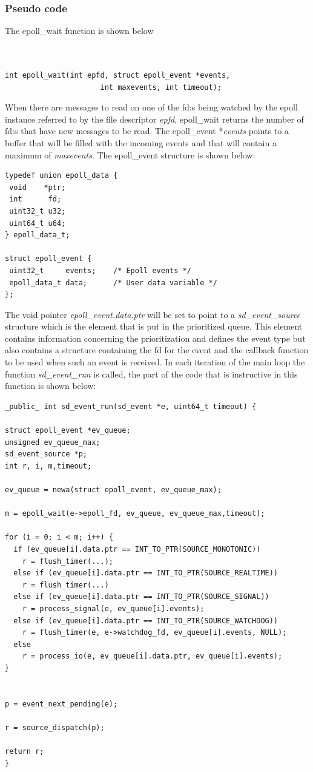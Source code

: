 \documentclass[nobiblatex]{LTHthesis}
\begin{document}
\subsubsection{Pseudo code}
The epoll\_wait function is shown below
\begin{verbatim}


int epoll_wait(int epfd, struct epoll_event *events,
                      int maxevents, int timeout);	 
\end{verbatim}
When there are messages to read on one of the fd:s being watched by the epoll instance referred to by the file descriptor \emph{epfd}, epoll\_wait returns the number of fd:s that have new messages to be read.
The epoll\_event *\emph{events} points to a buffer that will be filled with the incoming events and that will contain a maximum of \emph{maxevents}.
The epoll\_event structure is shown below:

%

\begin{verbatim}
typedef union epoll_data {
 void    *ptr;
 int      fd;
 uint32_t u32;
 uint64_t u64;
} epoll_data_t;

struct epoll_event {
 uint32_t     events;    /* Epoll events */
 epoll_data_t data;      /* User data variable */
};
\end{verbatim}

The void pointer \emph{epoll\_event.data.ptr} will be set to point to a \emph{sd\_event\_source} structure which is the element that is put in the prioritized queue. This element contains information concerning the prioritization and  defines the event type but also contains a structure containing the fd for the event and the callback function to be used when such an event is received.
In each iteration of the main loop the function \emph{sd\_event\_run} is called, the part of the code that is instructive in this function is shown below:

\begin{verbatim}
_public_ int sd_event_run(sd_event *e, uint64_t timeout) {

struct epoll_event *ev_queue;
unsigned ev_queue_max;
sd_event_source *p;
int r, i, m,timeout;
            
ev_queue = newa(struct epoll_event, ev_queue_max);

m = epoll_wait(e->epoll_fd, ev_queue, ev_queue_max,timeout);

for (i = 0; i < m; i++) {
  if (ev_queue[i].data.ptr == INT_TO_PTR(SOURCE_MONOTONIC))
    r = flush_timer(...);
  else if (ev_queue[i].data.ptr == INT_TO_PTR(SOURCE_REALTIME))
    r = flush_timer(...)
  else if (ev_queue[i].data.ptr == INT_TO_PTR(SOURCE_SIGNAL))
    r = process_signal(e, ev_queue[i].events);
  else if (ev_queue[i].data.ptr == INT_TO_PTR(SOURCE_WATCHDOG))
    r = flush_timer(e, e->watchdog_fd, ev_queue[i].events, NULL);
  else
    r = process_io(e, ev_queue[i].data.ptr, ev_queue[i].events);
}


p = event_next_pending(e);

r = source_dispatch(p);

return r;
}
\end{verbatim}
\end{document}
